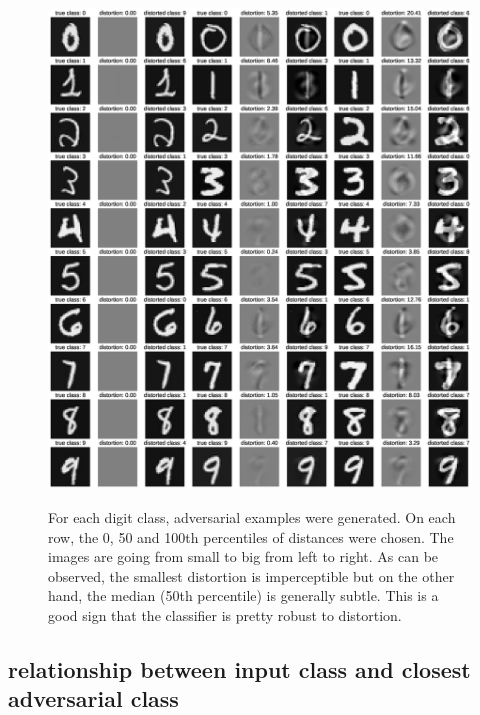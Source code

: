 \documentclass{article} %
\begin{document}
\begin{figure}[h!]
\begin{center}
\includegraphics[scale=0.37]{figs/sup_5}
\label{exp:sup_5}
\caption{\small For each digit class, adversarial examples were generated. On each row, the 0, 50 and 100th percentiles of distances were chosen. The images are going from small to big from left to right. As can be observed, the smallest distortion is imperceptible but on the other hand, the median (50th percentile) is generally subtle. This is a good sign that the classifier is pretty robust to distortion.}
\end{center}
\end{figure}
\null
\vfill
\newpage

\subsection{relationship between input class and closest adversarial class}
\end{document}
